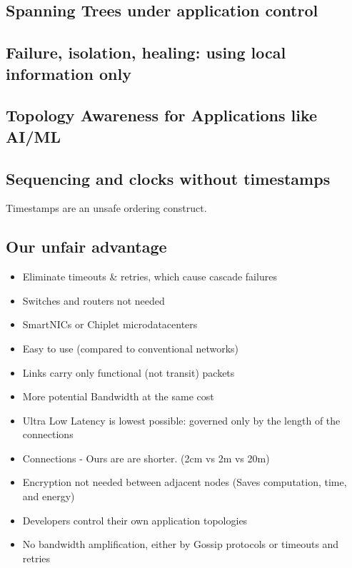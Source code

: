 \documentclass[../../../OAE-SPEC-MAIN.tex]{subfiles}
\begin{document}
\subsection{Spanning Trees under application control}

\subsection{Failure, isolation, healing: using local information only}
\subsection{Topology Awareness for Applications like AI/ML}

\subsection{Sequencing and clocks without timestamps}

Timestamps are an unsafe ordering construct.

\subsection{Our unfair advantage}
\begin{itemize}
  \item Eliminate timeouts \& retries, which cause cascade failures
  \item Switches and routers not needed
  \item SmartNICs or Chiplet microdatacenters
  \item Easy to use (compared to conventional networks)
  \item Links carry only functional (not transit) packets
  \item More potential Bandwidth at the same cost
  \item Ultra Low Latency is lowest possible: governed only by the length of the connections
  \item Connections - Ours are are shorter.  (2cm vs 2m vs 20m)
  \item Encryption not needed between adjacent nodes (Saves computation, time, and energy)
  \item Developers control their own application topologies
  \item No bandwidth amplification, either by Gossip protocols or timeouts and retries
\end{itemize}
\end{document}

